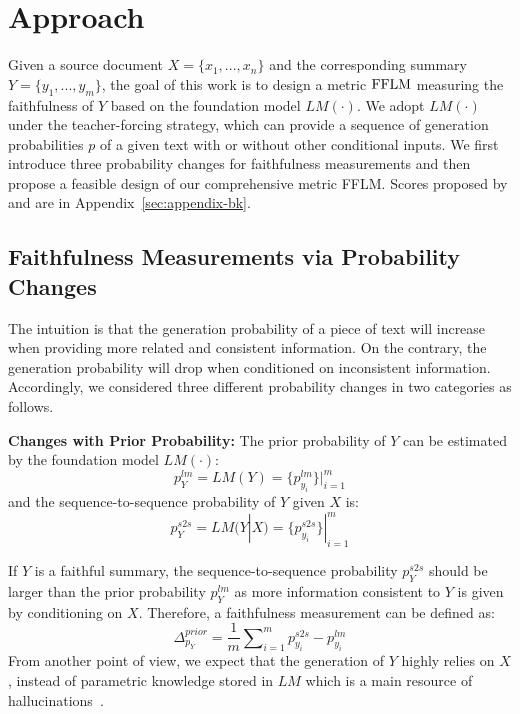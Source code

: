 \section{Approach}
\label{sec:approach}

Given a source document $X=\{x_1, ..., x_n\}$ and the corresponding summary $Y=\{y_1, ..., y_m\}$, the goal of this work is to design a metric $\rm FFLM$ measuring the faithfulness of $Y$ based on the foundation model $LM(\cdot)$. We adopt $LM(\cdot)$ under the teacher-forcing strategy, which can provide a sequence of generation probabilities $p$ of a given text with or without other conditional inputs.
We first introduce three probability changes for faithfulness measurements and then propose a feasible design of our comprehensive metric FFLM.
Scores proposed by \citet{she2022cop} and \citet{son2022harim} are in Appendix~\ref{sec:appendix-bk}.

\subsection{Faithfulness Measurements via Probability Changes}
\label{sec:approach-pc}

The intuition is that the generation probability of a piece of text will increase when providing more related and consistent information.
On the contrary, the generation probability will drop when conditioned on inconsistent information.
Accordingly, we considered three different probability changes in two categories as follows.


\textbf{Changes with Prior Probability:} 
The prior probability of $Y$ can be estimated by the foundation model $LM(\cdot)$:
\begin{equation}
	{p}_Y^{lm} = LM(Y) = \{p_{y_i}^{lm}\}|_{i=1}^m
\end{equation}
and the sequence-to-sequence probability of $Y$ given $X$ is:
\begin{equation}
	{p}_Y^{s2s} = LM(Y|X) = \{p_{y_i}^{s2s}\}|_{i=1}^m
\end{equation}

If $Y$ is a faithful summary, the sequence-to-sequence probability $p_Y^{s2s}$ should be larger than the prior probability $p_Y^{lm}$ as more  information consistent to $Y$ is given by conditioning on $X$.  
Therefore, a faithfulness measurement can be defined as:
\begin{equation}
	\Delta_{p_Y}^{prior} =\frac{1}{m}\sum \nolimits_{i=1}^m  p_{y_i}^{s2s} - p_{y_i}^{lm} 
\end{equation}
From another point of view, we expect that the generation of $Y$ highly relies on $X$, instead of parametric knowledge stored in $LM$ which is a main resource of hallucinations~\cite{ji2023survey}.

